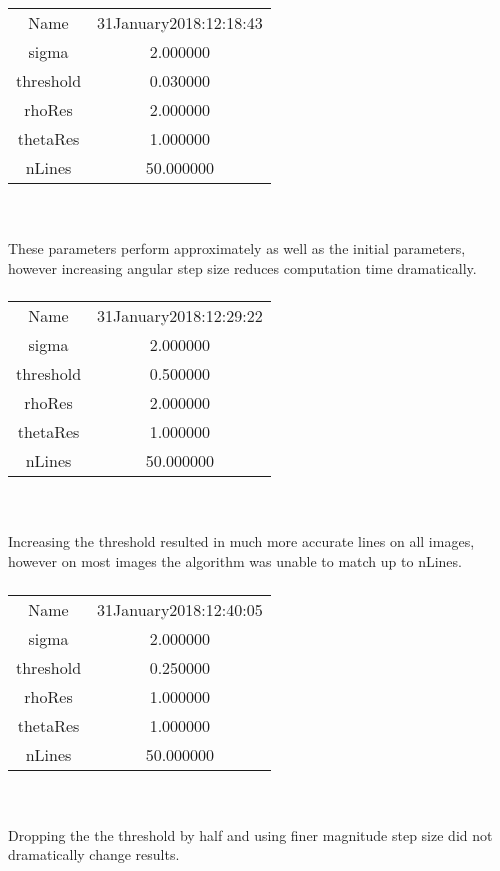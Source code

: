 \documentclass[12pt]{article}
\begin{document}
\subsubsection{}
\begin{tabular} { c c }
Name & 31January2018:12:18:43\\
sigma & 2.000000\\
threshold & 0.030000\\
rhoRes & 2.000000\\
thetaRes & 1.000000\\
nLines & 50.000000
\end{tabular}
\\ \\
These parameters perform approximately as well as the initial parameters, however increasing angular step size reduces computation time dramatically.

\subsubsection{}
\begin{tabular} { c c }
Name & 31January2018:12:29:22\\
sigma & 2.000000\\
threshold & 0.500000\\
rhoRes & 2.000000\\
thetaRes & 1.000000\\
nLines & 50.000000
\end{tabular}
\\ \\
Increasing the threshold resulted in much more accurate lines on all images, however on most images the algorithm was unable to match up to nLines.

\subsubsection{}
\begin{tabular} { c c }
Name & 31January2018:12:40:05\\
sigma & 2.000000\\
threshold & 0.250000\\
rhoRes & 1.000000\\
thetaRes & 1.000000\\
nLines & 50.000000
\end{tabular}
\\ \\
Dropping the the threshold by half and using finer magnitude step size did not dramatically change results.
\end{document}
